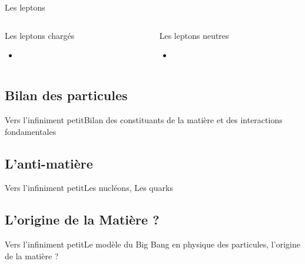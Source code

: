 \documentclass[handout,8pt]{beamer} %
\begin{document}
\begin{frame}{Les leptons}
	
	\begin{columns}
		\begin{column}{0.45\textwidth}
			\begin{block}{Les leptons chargés}
				\begin{itemize}
					\item 
				\end{itemize}
			\end{block}
		\end{column}
		\begin{column}{0.45\textwidth}
			\begin{block}{Les leptons neutres}
				\begin{itemize}
					\item 
				\end{itemize}
			\end{block}
		\end{column}
	\end{columns}

\end{frame}


\subsection{Bilan des particules}
\begin{frame}{Vers l’infiniment petit}{Bilan des constituants de la matière et des interactions fondamentales}

\end{frame}

\subsection{L’anti-matière}
\begin{frame}{Vers l’infiniment petit}{Les nucléons, Les quarks}

\end{frame}

\subsection{L'origine de la Matière ?}
\begin{frame}{Vers l’infiniment petit}{Le modèle du Big Bang en physique des particules, l'origine de la matière ?}

\end{frame}
\end{document}

